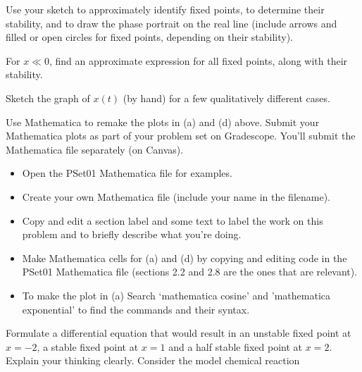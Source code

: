 \documentclass[12pt,letterpaper,noanswers]{exam}
\begin{document}
\begin{questions}
\begin{parts}

\item Use your sketch to approximately identify fixed points, to determine their stability, and to draw the phase portrait on the real line (include arrows and filled or open circles for fixed points, depending on their stability).
\item For $x\ll 0$, find an approximate expression for all fixed points, along with their stability.
\item Sketch the graph of $x(t)$ (by hand) for a few qualitatively different cases.
\item Use Mathematica to remake the plots in (a) and (d) above.  Submit your Mathematica plots as part of your problem set on Gradescope.  You'll submit the Mathematica file separately (on Canvas).
\begin{itemize}
\itemsep-0.1em
    \item Open the PSet01 Mathematica file for examples.
    \item Create your own Mathematica file (include your name in the filename). 
    \item Copy and edit a section label and some text to label the work on this problem and to briefly describe what you're doing.
    \item Make Mathematica cells for (a) and (d) by copying and editing code in the PSet01 Mathematica file (sections 2.2 and 2.8 are the ones that are relevant).
    \item To make the plot in (a) Search `mathematica cosine' and 'mathematica exponential' to find the commands and their syntax.
\end{itemize}   
\end{parts}
\question Formulate a differential equation that would result in an unstable fixed point at $x = -2$, a stable fixed point at $x = 1$ and a half stable fixed point at $x = 2$.  Explain your thinking clearly. 
\question Consider the model chemical reaction 


\end{questions}
\end{document}
